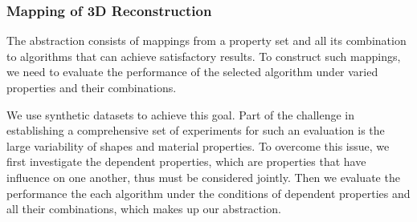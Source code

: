 \subsubsection{Mapping of 3D Reconstruction}
The abstraction consists of mappings from a property set and all its combination to algorithms that can achieve satisfactory results. To construct such mappings, we need to evaluate the performance of the selected algorithm under varied properties and their combinations.

We use synthetic datasets to achieve this goal. Part of the challenge in establishing a comprehensive set of experiments for such an evaluation is the large variability of shapes and material properties. To overcome this issue, we first investigate the dependent properties, which are properties that have influence on one another, thus must be considered jointly. Then we evaluate the performance the each algorithm under the conditions of dependent properties and all their combinations, which makes up our abstraction.

